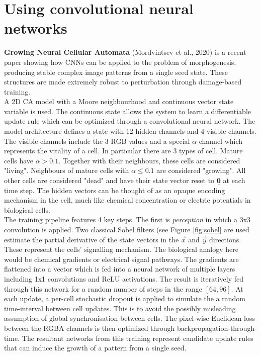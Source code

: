 \section{Using convolutional neural networks}

\noindent
\textbf{Growing Neural Cellular Automata} (Mordvintsev et al., 2020) \cite{mordvintsev2020growing} is a recent paper showing how CNNs can be applied to the problem of morphogenesis, producing stable complex image patterns from a single seed state. These structures are made extremely robust to perturbation through damage-based training. \\

A 2D CA model with a Moore neighbourhood and continuous vector state variable is used.
The continuous state allows the system to learn a differentiable update rule which can be optimized through a convolutional neural network.
The model architecture defines a state with 12 hidden channels and 4 visible channels.
The visible channels include the 3 RGB values and a special $\alpha$ channel which represents the vitality of a cell.
In particular there are 3 types of cell.
Mature cells have $\alpha > 0.1$.
Together with their neighbours, these cells are considered "living".
Neighbours of mature cells with $\alpha \leq 0.1$ are considered "growing".
All other cells are considered "dead" and have their state vector reset to $\underline{\mathbf{0}}$ at each time step.
The hidden vectors can be thought of as an opaque encoding mechanism in the cell, much like chemical concentration or electric potentials in biological cells.\\

The training pipeline features 4 key steps.
The first is \textit{perception} in which a 3x3 convolution is applied.
Two classical Sobel filters (see Figure \ref{fig:sobel} are used estimate the partial derivative of the state vectors in the $\overrightarrow{x}$ and $\overrightarrow{y}$ directions.
These represent the cells' signalling mechanism.
The biological analogy here would be chemical gradients or electrical signal pathways.
The gradients are flattened into a vector which is fed into a neural network of multiple layers including 1x1 convolutions and ReLU activations.
The result is iteratively fed through this network for a random number of steps in the range $[64, 96]$.
At each update, a per-cell stochastic dropout is applied to simulate the a random time-interval between cell updates.
This is to avoid the possibly misleading assumption of global synchronisation between cells.
The pixel-wise Euclidean loss between the RGBA channels is then optimized through backpropagation-through-time. The resultant networks from this training represent candidate update rules that can induce the growth of a pattern from a single seed.\\


